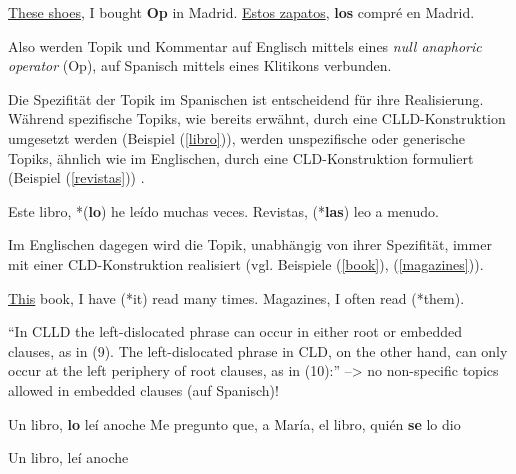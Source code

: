 \begin{exe}
    \ex \label{shoes} \uline{These shoes}, I bought \textbf{Op} in Madrid.
    \ex \label{zapatos} \uline{Estos zapatos}, \textbf{los} compré en Madrid.
\end{exe}

Also werden Topik und Kommentar auf Englisch mittels eines \textit{null anaphoric operator} (Op),
auf Spanisch mittels eines Klitikons verbunden.

Die Spezifität der Topik im Spanischen ist entscheidend für ihre Realisierung.
Während spezifische Topiks, wie bereits erwähnt, durch eine CLLD-Konstruktion umgesetzt werden (Beispiel (\ref{libro})),
werden unspezifische oder generische Topiks, ähnlich wie im Englischen, durch eine CLD-Konstruktion formuliert (Beispiel (\ref{revistas})) \cite{Valenzuela05}.

\begin{exe}
    \ex \label{libro} Este libro, *(\textbf{lo}) he leído muchas veces.
    \ex \label{revistas} Revistas, (*\textbf{las}) leo a menudo.
\end{exe}

Im Englischen dagegen wird die Topik, unabhängig von ihrer Spezifität, immer mit einer CLD-Konstruktion realisiert (vgl. Beispiele (\ref{book}), (\ref{magazines})).

\begin{exe}
    \ex \label{book} \uline{This} book, I have (*it) read many times.
    \ex \label{magazines} Magazines, I often read (*them).
\end{exe}

``In CLLD the left-dislocated phrase can occur in either root or embedded clauses, as in (9). The left-dislocated phrase in CLD, on the other hand, can only occur at the left periphery of root clauses, as in (10):''
--> no non-specific topics allowed in embedded clauses (auf Spanisch)!
\begin{exe}
    \ex \begin{xlist}
        \ex Un libro, \textbf{lo} leí anoche
        \ex Me pregunto que, a María, el libro, quién \textbf{se} lo dio
        \end{xlist}
    \ex \begin{xlist}
        \ex Un libro, leí anoche
        \end{xlist}
\end{exe}

